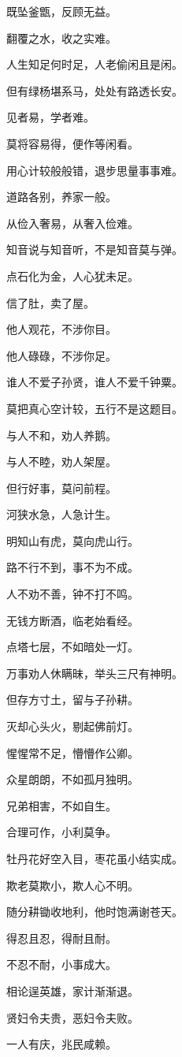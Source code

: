 \documentclass[12pt,oneside]{book}
\begin{document}
既坠釜甑，反顾无益。

翻覆之水，收之实难。

人生知足何时足，人老偷闲且是闲。

但有绿杨堪系马，处处有路透长安。

见者易，学者难。

莫将容易得，便作等闲看。

用心计较般般错，退步思量事事难。

道路各别，养家一般。

从俭入奢易，从奢入俭难。

知音说与知音听，不是知音莫与弹。

点石化为金，人心犹未足。

信了肚，卖了屋。

他人观花，不涉你目。

他人碌碌，不涉你足。

谁人不爱子孙贤，谁人不爱千钟粟。

莫把真心空计较，五行不是这题目。

与人不和，劝人养鹅。

与人不睦，劝人架屋。

但行好事，莫问前程。

河狭水急，人急计生。

明知山有虎，莫向虎山行。

路不行不到，事不为不成。

人不劝不善，钟不打不鸣。

无钱方断酒，临老始看经。

点塔七层，不如暗处一灯。

万事劝人休瞒昧，举头三尺有神明。

但存方寸土，留与子孙耕。

灭却心头火，剔起佛前灯。

惺惺常不足，懵懵作公卿。

众星朗朗，不如孤月独明。

兄弟相害，不如自生。

合理可作，小利莫争。

牡丹花好空入目，枣花虽小结实成。

欺老莫欺小，欺人心不明。

随分耕锄收地利，他时饱满谢苍天。

得忍且忍，得耐且耐。

不忍不耐，小事成大。

相论逞英雄，家计渐渐退。

贤妇令夫贵，恶妇令夫败。

一人有庆，兆民咸赖。
\end{document}

